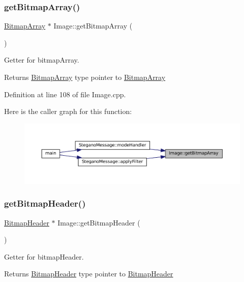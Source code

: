 \subsubsection{\texorpdfstring{getBitmapArray()}{getBitmapArray()}}
{\footnotesize\ttfamily \mbox{\hyperlink{classBitmapArray}{Bitmap\+Array}} $\ast$ Image\+::get\+Bitmap\+Array (\begin{DoxyParamCaption}{ }\end{DoxyParamCaption})}



Getter for bitmap\+Array. 

\begin{DoxyReturn}{Returns}
\mbox{\hyperlink{classBitmapArray}{Bitmap\+Array}} type pointer to \mbox{\hyperlink{classBitmapArray}{Bitmap\+Array}} 
\end{DoxyReturn}


Definition at line 108 of file Image.\+cpp.

Here is the caller graph for this function\+:\nopagebreak
\begin{figure}[H]
\begin{center}
\leavevmode
\includegraphics[width=350pt]{classImage_a75b5051c6cc39a5e3f86d287f5cc7f9c_icgraph}
\end{center}
\end{figure}
\mbox{\label{classImage_a8c824ffac0c866a94752a2c1047932af}} 
\subsubsection{\texorpdfstring{getBitmapHeader()}{getBitmapHeader()}}
{\footnotesize\ttfamily \mbox{\hyperlink{classBitmapHeader}{Bitmap\+Header}} $\ast$ Image\+::get\+Bitmap\+Header (\begin{DoxyParamCaption}{ }\end{DoxyParamCaption})}



Getter for bitmap\+Header. 

\begin{DoxyReturn}{Returns}
\mbox{\hyperlink{classBitmapHeader}{Bitmap\+Header}} type pointer to \mbox{\hyperlink{classBitmapHeader}{Bitmap\+Header}} 
\end{DoxyReturn}


